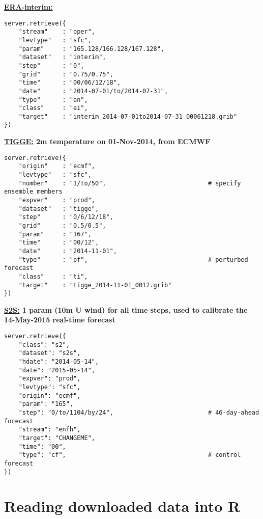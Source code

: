 \documentclass[10pt,fleqn]{article}
\begin{document}
\begin{framed}
\textbf{\href{https://software.ecmwf.int/wiki/display/WEBAPI/Python+ERA-interim+examples}{ERA-interim:} \footnotesize{}}
\begin{lstlisting}   
server.retrieve({
    "stream"    : "oper",
    "levtype"   : "sfc",
    "param"     : "165.128/166.128/167.128",
    "dataset"   : "interim",
    "step"      : "0",
    "grid"      : "0.75/0.75",
    "time"      : "00/06/12/18",
    "date"      : "2014-07-01/to/2014-07-31",
    "type"      : "an",
    "class"     : "ei",
    "target"    : "interim_2014-07-01to2014-07-31_00061218.grib"
})
\end{lstlisting}
\end{framed} %

\begin{framed}
\textbf{\href{https://software.ecmwf.int/wiki/display/WEBAPI/Python+TIGGE+examples}{TIGGE:} \footnotesize{2m temperature on 01-Nov-2014, from ECMWF}}
\begin{lstlisting}
server.retrieve({
    "origin"    : "ecmf",
    "levtype"   : "sfc",
    "number"    : "1/to/50",							# specify ensemble members
    "expver"    : "prod",
    "dataset"   : "tigge",
    "step"      : "0/6/12/18",
    "grid"      : "0.5/0.5",
    "param"     : "167",
    "time"      : "00/12",
    "date"      : "2014-11-01",
    "type"      : "pf",									# perturbed forecast
    "class"     : "ti",
    "target"    : "tigge_2014-11-01_0012.grib"
})
\end{lstlisting}
\end{framed} %


\begin{framed} %
\textbf{\href{https://software.ecmwf.int/wiki/display/WEBAPI/Python+S2S+examples}{S2S:} \footnotesize{1 param (10m U wind) for all time steps, used to calibrate the 14-May-2015 real-time forecast}}
\begin{lstlisting}
server.retrieve({
    "class": "s2",
    "dataset": "s2s",
    "hdate": "2014-05-14",
    "date": "2015-05-14",
    "expver": "prod",
    "levtype": "sfc",
    "origin": "ecmf",
    "param": "165",
    "step": "0/to/1104/by/24",							# 46-day-ahead forecast
    "stream": "enfh",
    "target": "CHANGEME",
    "time": "00",
    "type": "cf",										# control forecast
})
\end{lstlisting}
\end{framed}

\newpage
\section{Reading downloaded data into R}
\end{document}
